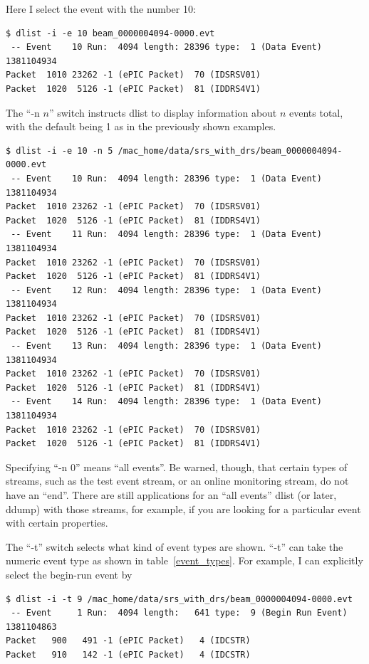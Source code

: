 \documentclass{article}[11pt]
\begin{document}
Here I select the event with the number 10:

\begin{verbatim}
$ dlist -i -e 10 beam_0000004094-0000.evt
 -- Event    10 Run:  4094 length: 28396 type:  1 (Data Event)  1381104934
Packet  1010 23262 -1 (ePIC Packet)  70 (IDSRSV01)
Packet  1020  5126 -1 (ePIC Packet)  81 (IDDRS4V1)
\end{verbatim}

The ``-n $n$'' switch instructs dlist to display information about $n$
events total, with the default being 1 as in the previously shown examples.

\begin{verbatim}
$ dlist -i -e 10 -n 5 /mac_home/data/srs_with_drs/beam_0000004094-0000.evt
 -- Event    10 Run:  4094 length: 28396 type:  1 (Data Event)  1381104934
Packet  1010 23262 -1 (ePIC Packet)  70 (IDSRSV01)
Packet  1020  5126 -1 (ePIC Packet)  81 (IDDRS4V1)
 -- Event    11 Run:  4094 length: 28396 type:  1 (Data Event)  1381104934
Packet  1010 23262 -1 (ePIC Packet)  70 (IDSRSV01)
Packet  1020  5126 -1 (ePIC Packet)  81 (IDDRS4V1)
 -- Event    12 Run:  4094 length: 28396 type:  1 (Data Event)  1381104934
Packet  1010 23262 -1 (ePIC Packet)  70 (IDSRSV01)
Packet  1020  5126 -1 (ePIC Packet)  81 (IDDRS4V1)
 -- Event    13 Run:  4094 length: 28396 type:  1 (Data Event)  1381104934
Packet  1010 23262 -1 (ePIC Packet)  70 (IDSRSV01)
Packet  1020  5126 -1 (ePIC Packet)  81 (IDDRS4V1)
 -- Event    14 Run:  4094 length: 28396 type:  1 (Data Event)  1381104934
Packet  1010 23262 -1 (ePIC Packet)  70 (IDSRSV01)
Packet  1020  5126 -1 (ePIC Packet)  81 (IDDRS4V1)
\end{verbatim}

Specifying ``-n 0'' means ``all events''. Be warned, though, that
certain types of streams, such as the test event stream, or an online
monitoring stream, do not have an ``end''. There are still
applications for an ``all events'' dlist (or later, ddump) with those
streams, for example, if you are looking for a particular event with
certain properties.

The ``-t'' switch selects what kind of event types are shown. ``-t''
can take the numeric event type as shown in
table~\ref{event_types}. For example, I can explicitly select the
begin-run event by

\begin{verbatim}
$ dlist -i -t 9 /mac_home/data/srs_with_drs/beam_0000004094-0000.evt
 -- Event     1 Run:  4094 length:   641 type:  9 (Begin Run Event)  1381104863
Packet   900   491 -1 (ePIC Packet)   4 (IDCSTR)
Packet   910   142 -1 (ePIC Packet)   4 (IDCSTR)
\end{verbatim}
\end{document}
